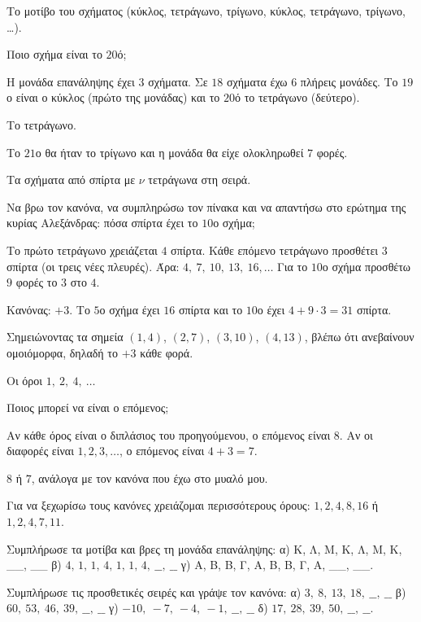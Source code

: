 \tixero Το μοτίβο του σχήματος (κύκλος, τετράγωνο, τρίγωνο, κύκλος, τετράγωνο, τρίγωνο, \ldots).\par
\tithelo Ποιο σχήμα είναι το $20$ό;\par
\possindeo Η μονάδα επανάληψης έχει $3$ σχήματα. Σε $18$ σχήματα έχω $6$ πλήρεις μονάδες. Το $19$ο είναι ο κύκλος (πρώτο της μονάδας) και το $20$ό το τετράγωνο (δεύτερο).\par
\apantisi Το τετράγωνο.\par
\elegxos Το $21$ο θα ήταν το τρίγωνο και η μονάδα θα είχε ολοκληρωθεί $7$ φορές.

\tixero Τα σχήματα από σπίρτα με $\nu$ τετράγωνα στη σειρά.\par
\tithelo Να βρω τον κανόνα, να συμπληρώσω τον πίνακα και να απαντήσω στο ερώτημα της κυρίας Αλεξάνδρας: πόσα σπίρτα έχει το $10$ο σχήμα;\par
\possindeo Το πρώτο τετράγωνο χρειάζεται $4$ σπίρτα. Κάθε επόμενο τετράγωνο προσθέτει $3$ σπίρτα (οι τρεις νέες πλευρές). Άρα: $4,\ 7,\ 10,\ 13,\ 16,\dots$ Για το $10$ο σχήμα προσθέτω $9$ φορές το $3$ στο $4$.\par
\apantisi Κανόνας: $+3$. Το $5$ο σχήμα έχει $16$ σπίρτα και το $10$ο έχει $4+9\cdot3=31$ σπίρτα.\par
\elegxos Σημειώνοντας τα σημεία $(1,4)$, $(2,7)$, $(3,10)$, $(4,13)$, βλέπω ότι ανεβαίνουν ομοιόμορφα, δηλαδή το $+3$ κάθε φορά.

\tixero Οι όροι $1,\ 2,\ 4,\ \ldots$\par
\tithelo Ποιος μπορεί να είναι ο επόμενος;\par
\possindeo Αν κάθε όρος είναι ο διπλάσιος του προηγούμενου, ο επόμενος είναι $8$. Αν οι διαφορές είναι $1,2,3,\dots$, ο επόμενος είναι $4+3=7$.\par
\apantisi $8$ ή $7$, ανάλογα με τον κανόνα που έχω στο μυαλό μου.\par
\elegxos Για να ξεχωρίσω τους κανόνες χρειάζομαι περισσότερους όρους: $1,2,4,8,16$ ή $1,2,4,7,11$.



\ex Συμπλήρωσε τα μοτίβα και βρες τη μονάδα επανάληψης: α) Κ, Λ, Μ, Κ, Λ, Μ, Κ, \_\_, \_\_ \quad β) $4,\,1,\,1,\,4,\,1,\,1,\,4,\ \_\_,\ \_\_$ \quad γ) Α, Β, Β, Γ, Α, Β, Β, Γ, Α, \_\_, \_\_.

\ex Συμπλήρωσε τις προσθετικές σειρές και γράψε τον κανόνα: α) $3,\ 8,\ 13,\ 18,\ \_\_,\ \_\_$ \quad β) $60,\ 53,\ 46,\ 39,\ \_\_,\ \_\_$ \quad γ) $-10,\ -7,\ -4,\ -1,\ \_\_,\ \_\_$ \quad δ) $17,\ 28,\ 39,\ 50,\ \_\_,\ \_\_$.

